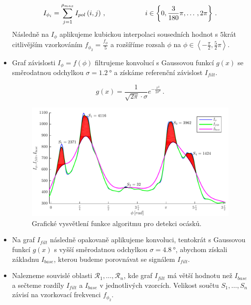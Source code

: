 \begin{itemize}
	\begin{equation}
	I_{\phi_i} = \sum_{j = 1}^{\rho_{max}} I_{pol}\left(i,j\right)\,, \hspace*{2cm} i \in \left\lbrace 0, \frac{3}{180}\pi, \dots \,,2\pi \right\rbrace\,.
	\label{eq:Isuma}
	\end{equation}
	Následně na $I_{\phi}$ aplikujeme kubickou interpolaci sousedních hodnot s $5$krát citlivějším vzorkováním $f_{\phi_2} = \frac{f_{\phi}}{5}$ a rozšíříme rozsah $\phi$ na $\phi \in \left\langle -\frac{\pi}{2},\frac{5}{2}\pi \right\rangle$. 
	
	\item Graf závislosti $I_\phi = f(\phi)$ filtrujeme konvolucí s Gaussovou funkcí $g(x)$ se směrodatnou odchylkou $\sigma = \SI{1.2}{\degree}$ a získáme referenční závislost $I_{filt}$.
	
	\begin{equation}
		g(x) = \frac{1}{\sqrt{2\pi} \cdot \sigma}e^{-\frac{x^2}{2\sigma^2}}\,.
	\end{equation}
	
	\begin{figure}[htbp]
    \centering\includegraphics[width=\textwidth]{figures/tailex05.pdf}
     \caption[Detekce ocásků - zpracování polárního grafu.]{Grafické vysvětlení funkce algoritmu pro detekci ocásků. }
    \label{fig:tailSumGraph}
	\end{figure}
	
	\item Na graf $I_{filt}$ následně opakovaně aplikujeme konvoluci, tentokrát s Gaussovou funkcí $g(x)$ s vyšší směrodatnou odchylkou $\sigma = \SI{4.8}{\degree}$, abychom získali základnu $I_{base}$, kterou budeme porovnávat se signálem $I_{filt}$.
	
	\item Nalezneme souvislé oblasti $\mathcal{R}_1, \dots , \mathcal{R}_n$, kde graf $I_{filt}$ má větší hodnotu než $I_{base}$ a sečteme rozdíly $I_{filt}$ a $I_{base}$ v jednotlivých vzorcích. Velikost součtu $S_1, \dots , S_n$ závisí na vzorkovací frekvenci $f_{\phi_2}$.
	

\end{itemize}
